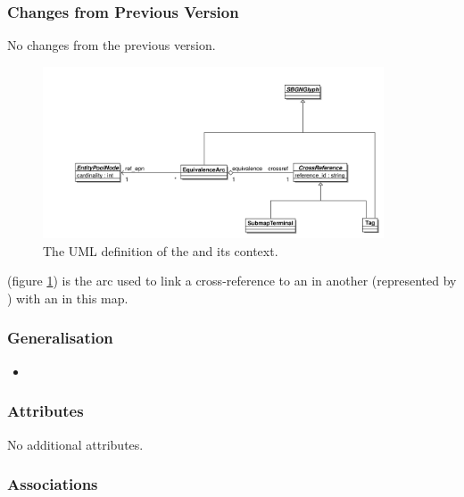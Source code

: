 \subsubsection{Changes from Previous Version}

No changes from the previous version.

\label{defn:EquivalenceArc}

\begin{figure}[htb]
  \centering
  \includegraphics[width = 0.9\textwidth]{images/equivalencearcuml}
  \caption{The UML definition of the  and its context.}
  \label{fig:techref:equivalencearcuml}
\end{figure}


 (figure \ref{fig:techref:equivalencearcuml}) is the arc used to link a cross-reference
to an  in another \PDm (represented by )
with an  in this map.

\subsubsection{Generalisation}

\begin{itemize}
\item {}
\end{itemize}

\subsubsection{Attributes}

No additional attributes.

\subsubsection{Associations}

